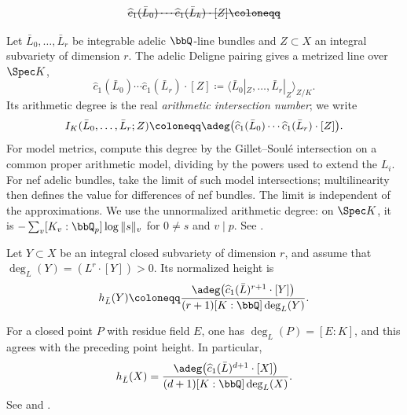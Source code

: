 \begin{definition}[label=\labelNFM{def:arithmetic-intersection-and-subvariety-height}, status=draft, tag=0000000]
	\[ \latexdeletedmath{\widehat c_1(\bar L_0)\cdots\widehat c_1(\bar L_k)\cdot[Z] \coloneqq} \]
	\begin{latexmathchange}
	Let $\bar L_0,\ldots,\bar L_r$ be integrable adelic $\bbQ$-line bundles and $Z \subset X$ an integral subvariety of dimension $r$.
	The adelic Deligne pairing gives a metrized line over $\Spec K$,
	\[ \widehat c_1(\bar L_0)\cdots\widehat c_1(\bar L_r)\cdot[Z] \coloneqq \langle\bar L_0|_Z,\ldots,\bar L_r|_Z\rangle_{Z/K}. \]
	Its arithmetic degree is the real \emph{arithmetic intersection number}; we write
	\[ I_K(\bar L_0,\ldots,\bar L_r;Z) \coloneqq \adeg\bigl(\widehat c_1(\bar L_0)\cdots\widehat c_1(\bar L_r)\cdot[Z]\bigr). \]
	For model metrics, compute this degree by the Gillet--Soul\'e intersection on a common proper arithmetic model, dividing by the powers used to extend the $L_i$.
	For nef adelic bundles, take the limit of such model intersections; multilinearity then defines the value for differences of nef bundles.
	The limit is independent of the approximations.
	We use the unnormalized arithmetic degree: on $\Spec K$, it is $-\sum_v[K_v:\bbQ_p]\log\|s\|_v$ for $0 \neq s$ and $v \mid p$.
	See \cite[\S 4.1 and Appendix~A.5.3]{Yuan-Zhang-2026-AdelicLineBundles}.
	\end{latexmathchange}
	Let $Y \subset X$ be an integral closed subvariety of dimension $r$, and assume that $\deg_L(Y) = (L^r \cdot [Y]) > 0$.
	Its normalized height is
	\[ h_{\bar L}(Y) \coloneqq \frac{\adeg\bigl(\widehat c_1(\bar L)^{r+1}\cdot[Y]\bigr)}{(r+1)[K:\bbQ]\deg_L(Y)}. \]
	\Yang{}
\end{definition}

For a closed point $P$ with residue field $E$, one has $\deg_L(P) = [E:K]$, and this agrees with the preceding point height.
In particular,
\[ h_{\bar L}(X) = \frac{\adeg\bigl(\widehat c_1(\bar L)^{d+1}\cdot[X]\bigr)}{(d+1)[K:\bbQ]\deg_L(X)}. \]
See \cite[\S 3.2]{Chambert-Loir-2012-ArakelovGeometryHeights} and \cite[Appendix~A.5.3]{Yuan-Zhang-2026-AdelicLineBundles}.

